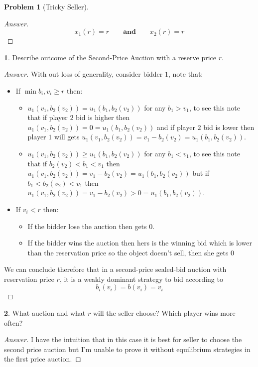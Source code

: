 \documentclass[12pt]{article}
\theoremstyle{definition}
\newtheorem{problem}{Problem}
\newtheorem{subproblem}{}[problem]
\newcommand{\qaq}{\qquad \textbf{and} \qquad}
\begin{document}
\begin{problem}[Tricky Seller]
\begin{proof}[Answer]
$$x_1(r) = r \qaq x_2(r)=r$$

\end{proof}
\begin{subproblem}
Describe outcome of the Second-Price Auction with a reserve price $r$.
\end{subproblem}
\begin{proof}[Answer]
With out loss of generality, consider bidder $1$, note that:
 \begin{itemize}
 \item If $\min{b_i,v_i}\geq r$ then:
 \begin{itemize}
     \item  $u_1(v_1,b_2(v_2))=u_1(b_1,b_2(v_2))$ for any $b_1>v_1$, to see this note that if player $2$ bid is higher then $u_1(v_1,b_2(v_2))=0=u_1(b_1,b_2(v_2))$ and if player $2$ bid is lower then player $1$ will gets $u_1(v_1,b_2(v_2))=v_1 - b_2(v_2)=u_1(b_1,b_2(v_2))$.
    \item $u_1(v_1,b_2(v_2))\geq u_1(b_1,b_2(v_2))$ for any $b_1<v_1$, to see this note that if $b_2(v_2)<b_1<v_1$ then  $u_1(v_1,b_2(v_2)) =v_1 - b_2(v_2) = u_1(b_1,b_2(v_2))$ but if  $b_1<b_2(v_2)<v_1$ then $u_1(v_1,b_2(v_2)) =v_1 - b_2(v_2) >0= u_1(b_1,b_2(v_2))$.
\end{itemize}
\item If $v_i<r$ then:
\begin{itemize}
    \item If the bidder lose the auction then gets $0$.
    \item If the bidder wins the auction then hers is the winning bid which is lower than the reservation price so the object doesn't sell, then she gets $0$
\end{itemize}
\end{itemize}

We can conclude therefore that in a second-price sealed-bid auction with reservation price $r$, it is a weakly dominant strategy to bid according to $$b_i(v_i) = b(v_i) =
    v_i 
$$
\end{proof}
\begin{subproblem}
 What auction and what $r$ will the seller choose? Which player wins more often?
\end{subproblem}
\begin{proof}[Answer]

I have the intuition that in this case it is best for seller to choose the second price auction but I'm unable to prove it without equilibrium strategies in the first price auction.


\end{proof}
\end{problem}
\end{document}
